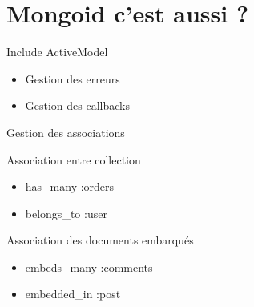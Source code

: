 \documentclass{beamer}
\begin{document}
\section{Mongoid c'est aussi ?}

\begin{frame}
  \begin{center}
    \Huge{}
    Include ActiveModel
  \end{center}

  \begin{itemize}
    \item Gestion des erreurs
    \item Gestion des callbacks
  \end{itemize}
\end{frame}

\begin{frame}
  \begin{center}
    \Huge{}
    Gestion des associations
  \end{center}
\end{frame}

\begin{frame}
  \begin{center}
    \Huge{}
    Association entre collection
  \end{center}

  \begin{itemize}
    \item has\_many :orders
    \item belongs\_to :user
  \end{itemize}
\end{frame}


\begin{frame}
  
\end{frame}

\begin{frame}
  
\end{frame}

\begin{frame}
  \begin{center}
    \Huge{}
    Association des documents embarqués
  \end{center}

  \begin{itemize}
    \item embeds\_many :comments
    \item embedded\_in :post
  \end{itemize}

\end{frame}
\end{document}
